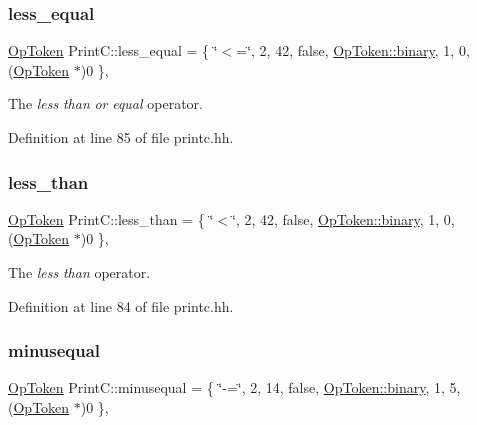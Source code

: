 \mbox{\label{class_print_c_a22c98035ceb2682d83cbd0e2aa088c95}} 
\subsubsection{\texorpdfstring{less\_equal}{less\_equal}}
{\footnotesize\ttfamily \mbox{\hyperlink{class_op_token}{Op\+Token}} Print\+C\+::less\+\_\+equal = \{ \char`\"{}$<$=\char`\"{}, 2, 42, false, \mbox{\hyperlink{class_op_token_af41c7f108d5662ede7765c5a6c44eaffa3a2ec63522a9329a71ddbe8adc3e752d}{Op\+Token\+::binary}}, 1, 0, (\mbox{\hyperlink{class_op_token}{Op\+Token}} $\ast$)0 \}\hspace{0.3cm}{\ttfamily [static]}, {\ttfamily [protected]}}



The {\itshape less} {\itshape than} {\itshape or} {\itshape equal} operator. 



Definition at line 85 of file printc.\+hh.

\mbox{\label{class_print_c_a2ce89de69cae922cb42cf0ee12c6dd84}} 
\subsubsection{\texorpdfstring{less\_than}{less\_than}}
{\footnotesize\ttfamily \mbox{\hyperlink{class_op_token}{Op\+Token}} Print\+C\+::less\+\_\+than = \{ \char`\"{}$<$\char`\"{}, 2, 42, false, \mbox{\hyperlink{class_op_token_af41c7f108d5662ede7765c5a6c44eaffa3a2ec63522a9329a71ddbe8adc3e752d}{Op\+Token\+::binary}}, 1, 0, (\mbox{\hyperlink{class_op_token}{Op\+Token}} $\ast$)0 \}\hspace{0.3cm}{\ttfamily [static]}, {\ttfamily [protected]}}



The {\itshape less} {\itshape than} operator. 



Definition at line 84 of file printc.\+hh.

\mbox{\label{class_print_c_ab4764b02a9d4c06c3b76ccd7ea690618}} 
\subsubsection{\texorpdfstring{minusequal}{minusequal}}
{\footnotesize\ttfamily \mbox{\hyperlink{class_op_token}{Op\+Token}} Print\+C\+::minusequal = \{ \char`\"{}-\/=\char`\"{}, 2, 14, false, \mbox{\hyperlink{class_op_token_af41c7f108d5662ede7765c5a6c44eaffa3a2ec63522a9329a71ddbe8adc3e752d}{Op\+Token\+::binary}}, 1, 5, (\mbox{\hyperlink{class_op_token}{Op\+Token}} $\ast$)0 \}\hspace{0.3cm}{\ttfamily [static]}, {\ttfamily [protected]}}



